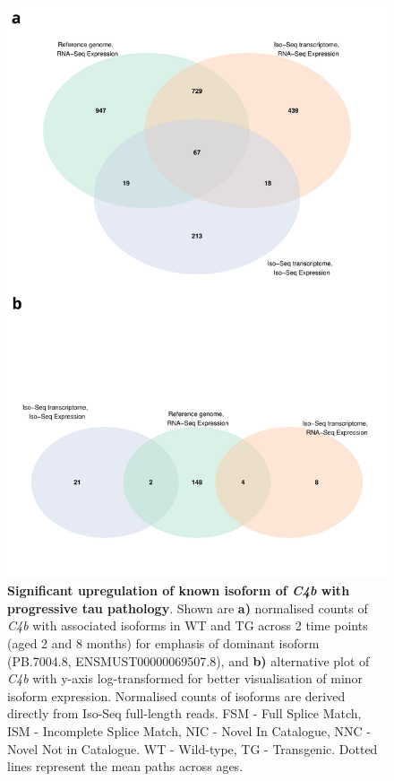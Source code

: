 \begin{figure}[!htp]
	\centering
	\includegraphics[page=12,scale = 0.55]{Figures/WholeDifferentialAnalysis.pdf}
	\captionsetup{width=0.95\textwidth}
	\caption[Differential Isoform Expression: Changes in transcript expression of isoforms associated with \textit{C4b}]%
	{\textbf{Significant upregulation of known isoform of \textit{C4b} with progressive tau pathology}. Shown are \textbf{a)} normalised counts of \textit{C4b} with associated isoforms in WT and TG across 2 time points (aged 2 and 8 months) for emphasis of dominant isoform (PB.7004.8, ENSMUST00000069507.8), and \textbf{b)} alternative plot of \textit{C4b} with y-axis log-transformed for better visualisation of minor isoform expression. Normalised counts of isoforms are derived directly from Iso-Seq full-length reads. FSM - Full Splice Match, ISM - Incomplete Splice Match, NIC - Novel In Catalogue, NNC - Novel Not in Catalogue. WT - Wild-type, TG - Transgenic. Dotted lines represent the mean paths across ages.}   
	\label{fig:DEI_c4b}
\end{figure}

